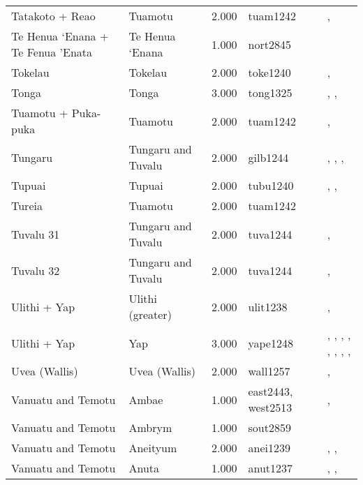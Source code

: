 \begin{longtable}{p{1.8cm}p{1.8cm}p{1.8cm}p{2cm}p{7cm}}
  Tatakoto + Reao & Tuamotu & 2.000 & tuam1242 & \citet{emory1975material}, \citet{emory1975material} \\ 
  Te Henua ‘Enana + Te Fenua ’Enata & Te Henua ‘Enana & 1.000 & nort2845 & \citet{sahlins1958social} \\ 
  Tokelau & Tokelau & 2.000 & toke1240 & \citet{hooper1973demographic}, \citet{macgregor1937} \\ 
  Tonga & Tonga & 3.000 & tong1325 & \citet{kirch1984evolution}, \citet{cummins1977tongan}, \citet{ferdon1988early} \\ 
  Tuamotu + Puka-puka & Tuamotu & 2.000 & tuam1242 & \citet{emory1975material}, \citet{emory1975material} \\ 
  Tungaru & Tungaru and Tuvalu & 2.000 & gilb1244 & \citet{lambert1966}, \citet{lambert1975makin}, \citet{lambert1991}, \citet{macdonald1982cinderellas} \\ 
  Tupuai & Tupuai & 2.000 & tubu1240 & \citet{aitken1930ethnology}, \citet{bollt2008excavations}, \citet{edwards2003archaeological} \\ 
  Tureia & Tuamotu & 2.000 & tuam1242 & \citet{emory1975material} \\ 
  Tuvalu 31 & Tungaru and Tuvalu & 2.000 & tuva1244 & \citet{macdonald1982cinderellas}, \citet{goldsmith1991} \\ 
  Tuvalu 32 & Tungaru and Tuvalu & 2.000 & tuva1244 & \citet{macdonald1982cinderellas}, \citet{goldsmith1991} \\ 
  Ulithi + Yap & Ulithi (greater) & 2.000 & ulit1238 & \citet{lessa1950}, \citet{lessa1966} \\ 
  Ulithi + Yap & Yap & 3.000 & yape1248 & \citet{huntetal1949}, \citet{muller1917}, \citet{murdocketal1944b}, \citet{salesius1906}, \citet{schneider1953}, \citet{schneider1957_yap}, \citet{schneider1962}, \citet{tetens_savages}, \citet{tetensandkubary1873} \\ 
  Uvea (Wallis) & Uvea (Wallis) & 2.000 & wall1257 & \citet{burrows1937}, \citet{pollock1995power} \\ 
  Vanuatu and Temotu & Ambae & 1.000 & east2443, west2513 & \citet{bonnemaison1972systeme}, \citet{bonnemaison1972systeme} \\ 
  Vanuatu and Temotu & Ambrym & 1.000 & sout2859 & \citet{tonkinson1981church} \\ 
  Vanuatu and Temotu & Aneityum & 2.000 & anei1239 & \citet{humphreys1926}, \citet{spriggs1982taro}, \citet{spriggs1986landscape} \\ 
  Vanuatu and Temotu & Anuta & 1.000 & anut1237 & \citet{feinberg1988socio}, \citet{feinberg1991}, \citet{kirch2002te} \\ 

\end{longtable}
